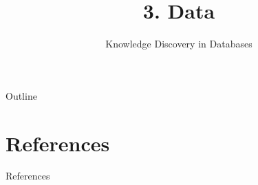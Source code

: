\documentclass[aspectratio=169,t]{beamer}
\title[KDD~3.~Data]{3. Data} %
\subtitle{Knowledge Discovery in Databases}
\begin{document}

  \maketitle

  { %
    \begin{frame}[noframenumbering]{Outline}
      \tableofcontents

    \end{frame}
  }

  
  
  
  
  
  

  \section*{References}
  \begin{frame}{References}
    \nocite{cleveland1993,dasu2003,fayyad2001,kaufman1990,dataReductionIssue1997,keim2002,naumann2013,pyle1999,santini1999,tufte2001,yu2009}
    \printbibliography
  \end{frame}
\end{document}
